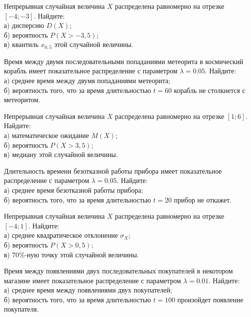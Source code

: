 

\z Непрерывная случайная величина $X$ распределена равномерно на отрезке $[-4; -3]$. Найдите: \\ \quad а) дисперсию $D(X)$; \\ \quad б) вероятность $P(X>-3{,}5)$; \\ \quad в) квантиль $x_{0{,}5}$ этой случайной величины.


\vfill

\z Время между двумя последовательными попаданиями метеорита в космический корабль имеет показательное распределение с параметром $\lambda = 0.05$. Найдите: \\ \quad а) среднее время между двумя попаданиями метеорита; \\ \quad б) вероятность того, что за время длительностью $t = 60$ корабль не столкнется с метеоритом.
 

\vfill

\newpage\setcounter{zad}{0}

\z Непрерывная случайная величина $X$ распределена равномерно на отрезке $[1; 6]$. Найдите: \\ \quad а) математическое ожидание $M(X)$; \\ \quad б) вероятность $P(X>3{,}5)$; \\ \quad в) медиану этой случайной величины.


\vfill

\z Длительность времени безотказной работы прибора имеет показательное распределение с параметром $\lambda = 0.05$. Найдите: \\ \quad а) среднее время безотказной работы прибора; \\ \quad б) вероятность того, что за время длительностью $t = 20$ прибор не откажет.
 

\vfill

\newpage\setcounter{zad}{0}

\z Непрерывная случайная величина $X$ распределена равномерно на отрезке $[-4; 1]$. Найдите: \\ \quad а) среднее квадратическое отклонение $\sigma_X$; \\ \quad б) вероятность $P(X>0{,}5)$; \\ \quad в) $70\%$-ную точку этой случайной величины.


\vfill

\z Время между появлениями двух последовательных покупателей в некотором магазине имеет показательное распределение с параметром $\lambda = 0.01$. Найдите: \\ \quad а) среднее время между появлениями двух покупателей; \\ \quad б) вероятность того, что за время длительностью $t = 100$  произойдет появление покупателя.
 


